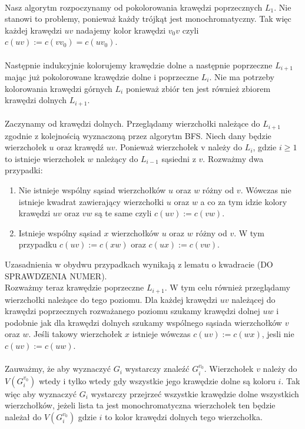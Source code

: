 \documentclass[12pt,a4paper,titlepage]{article}
\begin{document}
\\
Nasz algorytm rozpoczynamy od pokolorowania krawędzi poprzecznych $L_1$. Nie stanowi to problemy, ponieważ każdy trójkąt jest monochromatyczny. Tak więc każdej krawędzi $uv$ nadajemy kolor krawędzi $v_0 v$ czyli $c(uv):=c(v v_0 )=c(u v_0 )$.\\
\\
Następnie indukcyjnie kolorujemy krawędzie dolne a następnie poprzeczne $L_{i+1}$ mając już pokolorowane krawędzie dolne i poprzeczne $L_i$. Nie ma potrzeby kolorowania krawędzi górnych $L_i$ ponieważ zbiór ten jest również zbiorem krawędzi dolnych $L_{i+1}$.\\
\\
Zaczynamy od krawędzi dolnych. Przeglądamy wierzchołki należące do $L_{i+1}$ zgodnie z kolejnością wyznaczoną przez algorytm BFS. Niech dany będzie wierzchołek $u$ oraz krawędź $uv$. Ponieważ wierzchołek v należy do $L_i$, gdzie $i\geqslant 1$ to istnieje wierzchołek $w$ należący do $L_{i-1}$ sąsiedni z $v$. Rozważmy dwa przypadki:
\begin{enumerate}
\item Nie istnieje wspólny sąsiad wierzchołków $u$ oraz $w$ różny od $v$. Wówczas nie istnieje kwadrat zawierający wierzchołki $u$ oraz $w$ a co za tym idzie kolory krawędzi $uv$ oraz $vw$ są te same czyli $c(uv):=c(vw)$.
\item Istnieje wspólny sąsiad $x$ wierzchołków $u$ oraz $w$ różny od $v$. W tym przypadku $c(uv):=c(xw)$ oraz $c(ux):=c(vw)$. 
\end{enumerate}
Uzasadnienia w obydwu przypadkach wynikają z lematu o kwadracie (DO SPRAWDZENIA NUMER).\\
Rozważmy teraz krawędzie poprzeczne $L_{i+1}$. W tym celu również przeglądamy wierzchołki należące do tego poziomu. Dla każdej krawędzi $uv$ należącej do krawędzi poprzecznych rozważanego poziomu szukamy krawędzi dolnej $uw$ i podobnie jak dla krawędzi dolnych szukamy wspólnego sąsiada wierzchołków $v$ oraz $w$. Jeśli takowy wierzchołek $x$ istnieje wówczas $c(uv):=c(wx)$, jesli nie $c(uv):=c(uw)$.\\
\\
Zauważmy, że aby wyznaczyć $G_i$ wystarczy znaleźć $G_i ^{v_0}$. Wierzchołek $v$ należy do $V(G_i ^{v_0})$ wtedy i tylko wtedy gdy wszystkie jego krawędzie dolne są koloru $i$. Tak więc aby wyznaczyć $G_i$ wystarczy przejrzeć wszystkie krawędzie dolne wszystkich wierzchołków, jeżeli lista ta jest monochromatyczna wierzchołek ten będzie należał do $V(G_i ^{v_0})$ gdzie $i$ to kolor krawędzi dolnych tego wierzchołka.\\
\end{document}
